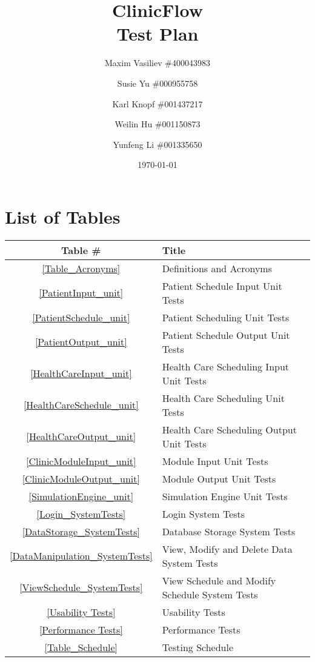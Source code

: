 \documentclass[12pt]{article}
\title{
ClinicFlow
\\\vspace{10mm}
\large \textbf{Test Plan}
\vspace{40mm}
}
\author{ Maxim Vasiliev \#400043983
\and
Susie Yu \#000955758
\and
Karl Knopf \#001437217
\and
Weilin Hu \#001150873
\and
Yunfeng Li \#001335650
}
\date{\today}
\begin{document}
\maketitle
\newpage
\tableofcontents
\newpage
{}

\section*{List of Tables}

\begin{center}
\begin{tabular}{cl}
\toprule

\bf Table \# & \bf Title\\\midrule

\ref{Table_Acronyms} & Definitions and Acronyms\\
\ref{PatientInput_unit} & Patient Schedule Input Unit Tests \\
\ref{PatientSchedule_unit}& Patient Scheduling Unit Tests\\
\ref{PatientOutput_unit} & Patient Schedule Output Unit Tests \\
\ref{HealthCareInput_unit}& Health Care Scheduling Input Unit Tests\\
\ref{HealthCareSchedule_unit}& Health Care Scheduling Unit Tests \\
\ref{HealthCareOutput_unit}& Health Care Scheduling Output Unit Tests \\
\ref{ClinicModuleInput_unit}& Module Input Unit Tests \\
\ref{ClinicModuleOutput_unit} &Module Output Unit Tests \\
\ref{SimulationEngine_unit} & Simulation Engine Unit Tests \\

\ref{Login_SystemTests} & Login System Tests \\
\ref{DataStorage_SystemTests} & Database Storage System Tests \\
\ref{DataManipulation_SystemTests} & View, Modify and Delete Data System Tests \\
\ref{ViewSchedule_SystemTests} & View Schedule and Modify Schedule System Tests \\
\ref{Usability Tests} & Usability Tests \\
\ref{Performance Tests} & Performance Tests \\
\ref{Table_Schedule} & Testing Schedule \\
\bottomrule
\end{tabular}
\end{center}
\end{document}
